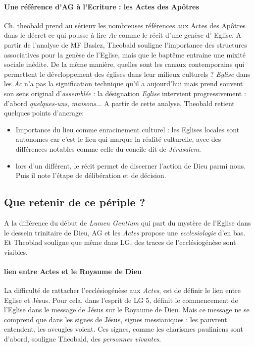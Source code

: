 \paragraph{Une référence d'AG à l'Ecriture : les Actes des Apôtres} Ch. theobald prend au sérieux les nombreuses références aux Actes des Apôtres dans le décret ce qui pousse à lire \textit{Ac} comme le récit d'une genèse d' Eglise. A partir de l'analyse de MF Baslez, Theobald souligne l'importance des structures associatives pour la genèse de l'Eglise, mais que le baptême entraine une mixité sociale inédite. De la même manière, quelles sont les canaux contemporains qui permettent le développement des églises dans leur milieux culturels ? \textit{Eglise} dans les \textit{Ac} n'a pas la signification technique qu'il a aujourd'hui mais prend souvent son sens original d'\textit{assemblée} : la désignation \textit{Eglise} intervient progressivement : d'abord \textit{quelques-uns}, \textit{maisons}...
A partir de cette analyse, Theobald retient quelques points d'ancrage: 
\begin{itemize}
    \item Importance du lieu comme enracinement culturel : les Eglises locales sont autonomes car c'est le lieu qui marque la réalité culturelle, avec des différences notables comme celle du concile dit de \textit{Jérusalem}.
    \item lors d'un différent, le récit permet de discerner l'action de Dieu parmi nous. Puis il note l'étape de délibération et de décision.
    
\end{itemize}

\subsection{Que retenir de ce périple ?}
 A la différence du début de \textit{Lumen Gentium} qui part du mystère de l'Eglise dans le dessein trinitaire de Dieu, AG et les \textit{Actes} propose une \textit{ecclesiologie} d'en bas. Et Theoblad souligne que même dans LG, des traces de l'ecclésiogénèse sont visibles.

\paragraph{lien entre Actes et le Royaume de Dieu} La difficulté de rattacher l'ecclésiogénèse aux \textit{Actes}, est de définir le lien entre Eglise et Jésus.  Pour cela, dans l'esprit de LG 5, définit le commencement de l'Eglise dans le message de Jésus sur le Royaume de Dieu. Mais ce message ne se comprend que dans les signes de Jésus, signes messianiques : les pauvrent entendent, les aveugles voient.
Ces signes, comme les charismes pauliniens sont d'abord, souligne Theobald, des \textit{personnes vivantes}.

